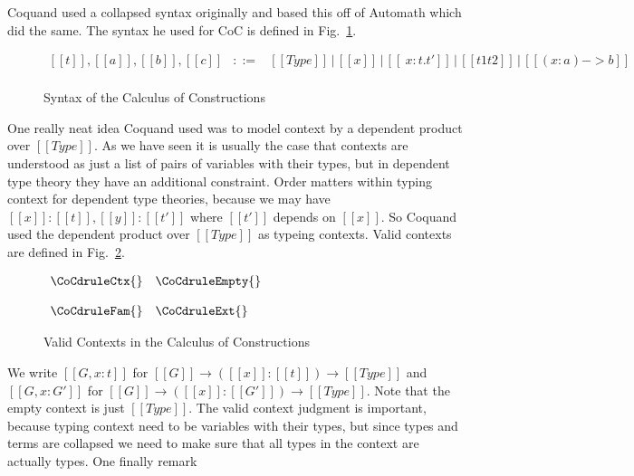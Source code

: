 Coquand used a collapsed syntax originally and based this off
of Automath which did the same.  The syntax he used for CoC is defined
in Fig.~\ref{fig:CoC_syntax}.
\begin{figure}
  \begin{center}
    \begin{math}
      \begin{array}{lll}
        [[t]], [[a]], [[b]], [[c]] & ::= &
        [[Type]]\,|\,[[x]]\,|\,[[\ x : t . t']]\,|\,[[t1 t2]]\,|\,[[(
            x : a ) -> b]]\\
      \end{array}
    \end{math}
  \end{center}
  \caption{Syntax of the Calculus of Constructions}
  \label{fig:CoC_syntax}
\end{figure}
One really neat idea Coquand used was to model context by a dependent
product over $[[Type]]$.  As we have seen it is usually the case
that contexts are understood as just a list of pairs of variables with
their types, but in dependent type theory they have an additional
constraint.  Order matters within typing context for dependent type
theories, because we may have $[[x]]:[[t]],[[y]]:[[t']]$ where
$[[t']]$ depends on $[[x]]$.  So Coquand used the dependent product
over $[[Type]]$ as typeing contexts.  Valid contexts are defined in
Fig.~\ref{fig:CoC_valid_contexts}.
\begin{figure}
  \begin{center}
    \begin{math}
      \begin{array}{lll}
        \CoCdruleCtx{} & \CoCdruleEmpty{}\\ 
        &\\
        \CoCdruleFam{} & \CoCdruleExt{}
      \end{array}
    \end{math}
  \end{center}
  
  \caption{Valid Contexts in the Calculus of Constructions}
  \label{fig:CoC_valid_contexts}
\end{figure}
We write $[[G,x:t]]$ for $[[G]] \to ([[x]] : [[t]]) \to [[Type]]$ and
$[[G,x:G']]$ for $[[G]] \to ([[x]] : [[G']]) \to [[Type]]$.  Note that
the empty context is just $[[Type]]$.  The valid context judgment is
important, because typing context need to be variables with their
types, but since types and terms are collapsed we need to make sure
that all types in the context are actually types.  One finally remark
